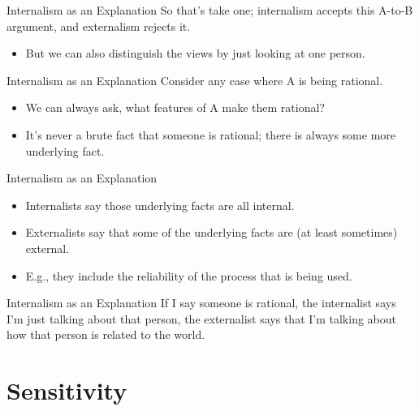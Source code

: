 \documentclass[
  17pt,
  letterpaper,
  ignorenonframetext,
  aspectratio=169,
  handout]{beamer}
\providecommand{\tightlist}{%
  \setlength{\itemsep}{0pt}\setlength{\parskip}{0pt}}\usepackage{longtable,booktabs,array}
\begin{document}
\begin{frame}{Internalism as an Explanation}
\protect\hypertarget{internalism-as-an-explanation}{}
So that's take one; internalism accepts this A-to-B argument, and
externalism rejects it.

\begin{itemize}[<+->]
\tightlist
\item
  But we can also distinguish the views by just looking at one person.
\end{itemize}
\end{frame}

\begin{frame}{Internalism as an Explanation}
\protect\hypertarget{internalism-as-an-explanation-1}{}
Consider any case where A is being rational.

\begin{itemize}[<+->]
\tightlist
\item
  We can always ask, what features of A make them rational?
\item
  It's never a brute fact that someone is rational; there is always some
  more underlying fact.
\end{itemize}
\end{frame}

\begin{frame}{Internalism as an Explanation}
\protect\hypertarget{internalism-as-an-explanation-2}{}
\begin{itemize}[<+->]
\tightlist
\item
  Internalists say those underlying facts are all internal.
\item
  Externalists say that some of the underlying facts are (at least
  sometimes) external.
\item
  E.g., they include the reliability of the process that is being used.
\end{itemize}
\end{frame}

\begin{frame}{Internalism as an Explanation}
\protect\hypertarget{internalism-as-an-explanation-3}{}
If I say someone is rational, the internalist says I'm just talking
about that person, the externalist says that I'm talking about how that
person is related to the world.
\end{frame}

\hypertarget{sensitivity}{%
\section{Sensitivity}\label{sensitivity}}
\end{document}
